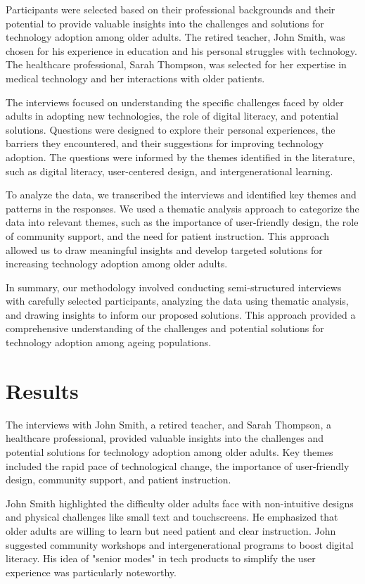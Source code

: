 \documentclass{article} %
\begin{document}
Participants were selected based on their professional backgrounds and their potential to provide valuable insights into the challenges and solutions for technology adoption among older adults. The retired teacher, John Smith, was chosen for his experience in education and his personal struggles with technology. The healthcare professional, Sarah Thompson, was selected for her expertise in medical technology and her interactions with older patients.

The interviews focused on understanding the specific challenges faced by older adults in adopting new technologies, the role of digital literacy, and potential solutions. Questions were designed to explore their personal experiences, the barriers they encountered, and their suggestions for improving technology adoption. The questions were informed by the themes identified in the literature, such as digital literacy, user-centered design, and intergenerational learning.

To analyze the data, we transcribed the interviews and identified key themes and patterns in the responses. We used a thematic analysis approach to categorize the data into relevant themes, such as the importance of user-friendly design, the role of community support, and the need for patient instruction. This approach allowed us to draw meaningful insights and develop targeted solutions for increasing technology adoption among older adults.

In summary, our methodology involved conducting semi-structured interviews with carefully selected participants, analyzing the data using thematic analysis, and drawing insights to inform our proposed solutions. This approach provided a comprehensive understanding of the challenges and potential solutions for technology adoption among ageing populations.


\section{Results}
\label{sec:results}

The interviews with John Smith, a retired teacher, and Sarah Thompson, a healthcare professional, provided valuable insights into the challenges and potential solutions for technology adoption among older adults. Key themes included the rapid pace of technological change, the importance of user-friendly design, community support, and patient instruction.

John Smith highlighted the difficulty older adults face with non-intuitive designs and physical challenges like small text and touchscreens. He emphasized that older adults are willing to learn but need patient and clear instruction. John suggested community workshops and intergenerational programs to boost digital literacy. His idea of "senior modes" in tech products to simplify the user experience was particularly noteworthy.
\end{document}
